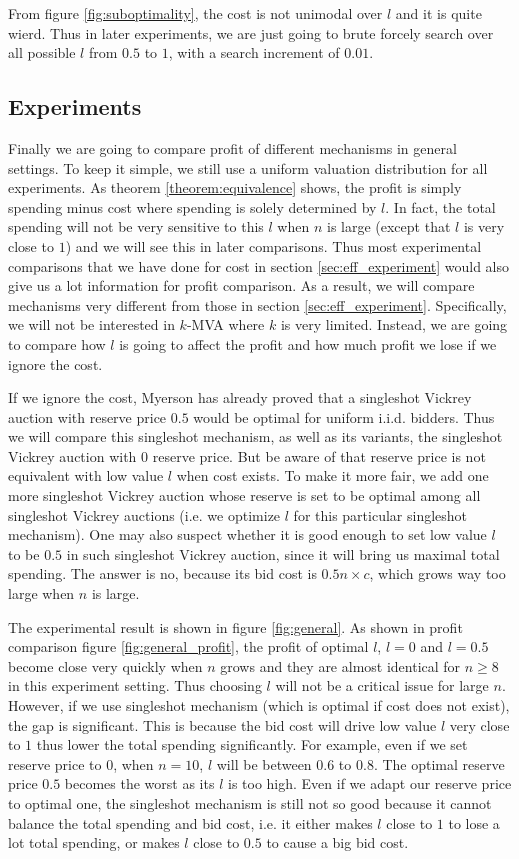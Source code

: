 From figure \ref{fig:suboptimality}, the cost is not unimodal over $l$ and it is quite wierd.
Thus in later experiments, we are just going to brute forcely search over all possible $l$ from $0.5$ to $1$,
with a search increment of $0.01$.

\subsection{Experiments}

Finally we are going to compare profit of different mechanisms in general settings.
To keep it simple, we still use a uniform valuation distribution for all
experiments.  As theorem \ref{theorem:equivalence} shows, the profit is simply
spending minus cost where spending is solely determined by $l$. In fact, the
total spending will not be very sensitive to this $l$ when $n$ is large (except
that $l$ is very close to $1$) and we will see this in later comparisons. Thus
most experimental comparisons that we have done for cost in section
\ref{sec:eff_experiment} would also give us a lot information for profit
comparison. As a result, we will compare mechanisms very different from those
in section \ref{sec:eff_experiment}. Specifically, we will not be interested in
$k$-MVA where $k$ is very limited. Instead, we are going to compare how $l$
is going to affect the profit and how much profit we lose if we ignore the cost.

If we ignore the cost, Myerson has already proved that a singleshot Vickrey
auction with reserve price $0.5$ would be optimal for uniform i.i.d. bidders.
Thus we will compare this singleshot mechanism, as well as its variants, the
singleshot Vickrey auction with $0$ reserve price. But be aware of that reserve
price is not equivalent with low value $l$  when cost exists. To make it more fair,
we add one more singleshot Vickrey auction whose reserve is set to be optimal
among all singleshot Vickrey auctions (i.e. we optimize $l$ for this particular
singleshot mechanism).
One may also suspect whether it is good enough to set low value $l$ to be $0.5$
in such singleshot Vickrey auction, since it will bring us maximal total
spending. The answer is no, because its bid cost is $0.5 n \times c$, which
grows way too large when $n$ is large.

The experimental result is shown in figure \ref{fig:general}. As shown in
profit comparison figure \ref{fig:general_profit}, the profit of optimal $l$,
$l = 0$ and $l = 0.5$ become close very quickly when $n$ grows and they are
almost identical for $n \geq 8$ in this experiment setting. Thus choosing $l$
will not be a critical issue for large $n$. However, if we use singleshot
mechanism (which is optimal if cost does not exist), the gap is significant.
This is because the bid cost will drive low value $l$ very
close to $1$ thus lower the total spending significantly. For example, even if
we set reserve price to $0$, when $n = 10$, $l$ will be between $0.6$ to $0.8$.
The optimal reserve price $0.5$ becomes the worst as its $l$ is too high. 
Even if we adapt our reserve price to optimal one, the singleshot mechanism is
still not so good because it cannot balance the total spending and bid cost,
i.e. it either makes $l$ close to $1$ to lose a lot total spending, or makes
$l$ close to $0.5$ to cause a big bid cost.
